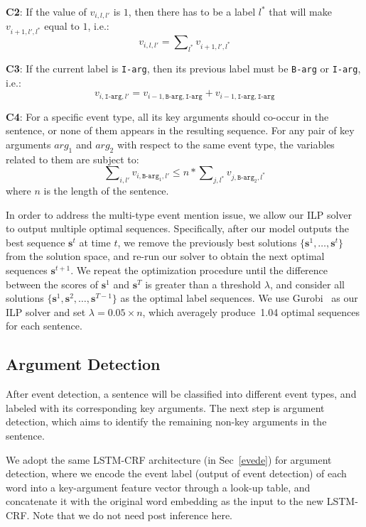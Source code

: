 \textbf{C2}: If the value of $v_{i,l,l'}$ is $1$, then there has to be a label $l^*$ that will make $v_{i+1,l',l^*}$ equal to $1$, i.e.:
\begin{equation}
	v_{i,l,l'} = \sum\nolimits_{l^*}v_{i+1,l',l^*}
\end{equation}

\textbf{C3}: If the current label is \texttt{I-arg}, then its previous label must be \texttt{B-arg} or \texttt{I-arg}, i.e.:
\begin{equation}
	v_{i,\texttt{I-arg},l'} = v_{i-1,\texttt{B-arg},\texttt{I-arg}} + v_{i-1, \texttt{I-arg}, \texttt{I-arg}}
\end{equation}

\textbf{C4}: For a specific event type, all its key arguments should co-occur in the sentence, or none of them appears in the resulting sequence. For any pair of key arguments $arg_1$ and $arg_2$ with respect to the same event type, the variables related to them are subject to:
\begin{equation}
	\sum\nolimits_{i,l'}{v_{i,\texttt{B-arg}_1,l'}} \leq n * \sum\nolimits_{j,l^*}{v_{j,\texttt{B-arg}_2,l^*}}
\end{equation}
where $n$ is the length of the sentence.

In order to address the multi-type event mention issue, we allow our ILP solver to output multiple optimal sequences. 
Specifically, after our model outputs the best sequence $\bm{s}^t$ at time $t$, we remove the previously best solutions 
 $\{\bm{s}^1, \ldots, \bm{s}^{t}\}$ from the solution space, and re-run our solver to obtain the next optimal sequences $\bm{s}^{t+1}$. 
We repeat the optimization procedure until the difference between the scores of $\bm{s}^1$ and $\bm{s}^T$ is greater 
than a threshold $\lambda$, and consider all solutions $\{\bm{s}^1, \bm{s}^2, \ldots, \bm{s}^{T-1}\}$ as the optimal label sequences. 
We use Gurobi~\cite{gurobi} as our ILP solver and set $\lambda=0.05 \times n$, which averagely produce~1.04 optimal sequences for each sentence. 

\subsection{Argument Detection}
After event detection, a sentence will be classified into different event types, and labeled with its corresponding key arguments. The next step is argument detection, which aims to identify the remaining non-key arguments in the sentence.  

We adopt the same LSTM-CRF architecture (in Sec~\ref{evede}) for argument detection, where we encode the event label (output of event detection) of each word into a key-argument feature vector through a look-up table, and concatenate it with the original word embedding as the input to the new LSTM-CRF. Note that we do not need post inference here.
